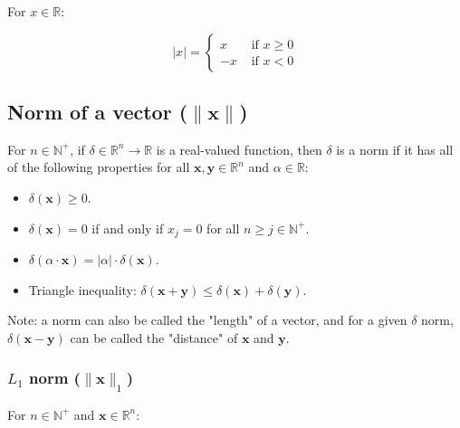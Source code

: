 \documentclass{article}
\begin{document}
        For $x \in \mathbb{R}$:

        \begin{equation*}
          | x | = \begin{cases}
              x & \text{ if } x \geq 0 \\
              -x & \text{ if } x < 0
          \end{cases}
        \end{equation*}

      \subsection{Norm of a vector ($\| \mathbf{x} \|$)}

        For $n \in \mathbb{N}^+$, if
        $\delta \in \mathbb{R}^n \rightarrow \mathbb{R}$ is a
        real-valued function, then $\delta$ is a norm if it has all of the
        following properties for all $\mathbf{x}, \mathbf{y} \in \mathbb{R}^n$
        and $\alpha \in \mathbb{R}$:

        \begin{itemize}
          \item $\delta(\mathbf{x}) \geq 0$.

          \item $\delta(\mathbf{x}) = 0$ if and only if $x_j = 0$ for all
                $n \geq j \in \mathbb{N}^+$.

          \item $
                  \delta(\alpha \cdot \mathbf{x})
                    = |\alpha| \cdot \delta(\mathbf{x})
                $.

          \item Triangle inequality: $
                  \delta(\mathbf{x} + \mathbf{y}) \leq
                    \delta(\mathbf{x}) + \delta(\mathbf{y})
                $.
        \end{itemize}

        Note: a norm can also be called the "length" of a vector, and for a
        given $\delta$ norm, $\delta(\mathbf{x} - \mathbf{y})$ can be called
        the "distance" of $\mathbf{x}$ and $\mathbf{y}$.

        \subsubsection{$L_1$ norm ($\| \mathbf{x} \|_1$)}

          For $n \in \mathbb{N}^+$ and $\mathbf{x} \in \mathbb{R}^n$:
\end{document}
